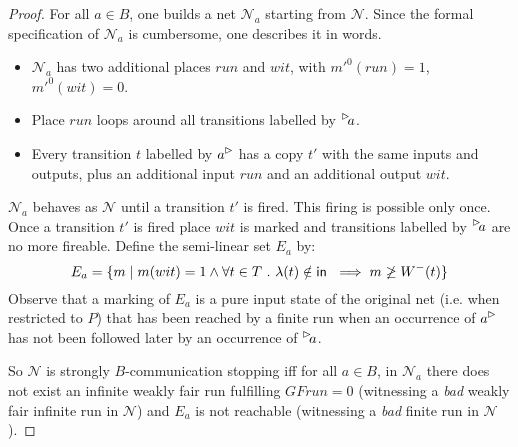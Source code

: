 \begin{proof}
\smallskip\noindent
For all $a \in B$, one builds a net $\mathcal N_a$
starting from $\mathcal N$.
Since the formal specification of  $\mathcal N_a$ is cumbersome, one describes
it in words.

\begin{itemize}
%
	\item $\mathcal N_a$ has two additional places $run$ and $wit$, 
	with $m'^0(run)=1$, $m'^0(wit)=0$.
%
	\item Place $run$ loops around all transitions labelled by $\inact{a}$.
%
	\item Every transition $t$ labelled by $\outact{a}$ has a copy $t'$
	with the same inputs and outputs, plus an additional input $run$
	and an additional output $wit$.
%
\end{itemize}

$\mathcal N_a$ behaves as $\mathcal N$ until a transition
$t'$ is fired. This firing is possible only once. Once a transition $t'$
is fired place $wit$ is marked and transitions labelled by $\inact{a}$
are no more fireable. Define the semi-linear set $E_a$ by:\\
\[E_a=\{m \mid m(wit)= 1 \wedge \forall t\in T\ .\  
\lambda(t)\notin \mathsf{in}\ \implies m\not\geq W^-(t)\}\]
Observe that a marking of $E_a$ is a pure input state of the original net 
(i.e. when restricted to $P$)
that has been reached by a finite run when an occurrence of $\outact{a}$ has not
been followed later by an occurrence of $\inact{a}$.  

\smallskip
So $\mathcal N$ is strongly $B$-communication stopping iff  for all $a \in B$, in $\mathcal N_a$ 
there does not exist an infinite weakly fair run fulfilling $GF run=0$ 
(witnessing a \emph{bad} weakly fair infinite run in $\mathcal N$)
and $E_a$ is not reachable (witnessing a \emph{bad} finite run in $\mathcal N$).
\end{proof}
